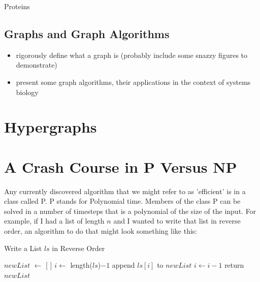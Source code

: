 \documentclass[12pt,twoside]{reedthesis}
\begin{document}
	Proteins 




\subsection{Graphs and Graph Algorithms}
\begin{itemize}
\item rigorously define what a graph is (probably include some snazzy figures to demonstrate)
\item present some graph algorithms, their applications in the context of systems biology
\end{itemize}


\section{Hypergraphs}


\section{A Crash Course in P Versus NP}	
\indent Any currently discovered algorithm that we might refer to as 'efficient' is in a class called P. P stands for Polynomial time. Members of the class P can be solved in a number of timesteps that is a polynomial of the size of the input. For example, if I had a list of length $n$ and I wanted to write that list in reverse order, an algorithm to do that might look something like this:
\begin{algorithm}
\caption{Write a List $ls$ in Reverse Order}
\begin{algorithmic} 
\State $newList$ $\gets$ [ ]
\State $i\gets$ length($ls$)$-1$
\State append $ls[i]$ to $newList$
\State $i \gets i - 1$
\EndWhile
\State return $newList$
\end{algorithmic}
\end{algorithm}
    
\end{document}
